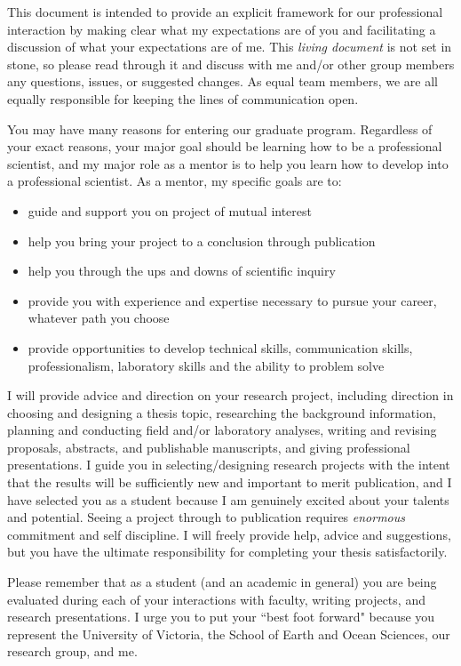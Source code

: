 \documentclass[11pt]{article}
\newcommand{\p}[1]{\vspace{1em} \noindent{\textbf{\textsc{#1~~}}}}
\begin{document}
\p{Summary} This document is intended to provide an explicit framework for our professional interaction by making clear what my expectations are of you and facilitating a discussion of what your expectations are of me. This \emph{living document} is not set in stone, so please read through it and discuss with me and/or other group members any questions, issues, or suggested changes. As equal team members, we are all equally responsible for keeping the lines of communication open.


\p{Goals} You may have many reasons for entering our graduate program. Regardless of your exact reasons, your major goal should be learning how to be a professional scientist, and my major role as a mentor is to help you learn how to develop into a professional scientist. As a mentor, my specific goals are to:
\begin{itemize}
\itemsep0em 
\item guide and support you on project of mutual interest
\item help you bring your project to a conclusion through publication
\item help you through the ups and downs of scientific inquiry
\item provide you with experience and expertise necessary to pursue your career, whatever path you choose
\item provide opportunities to develop technical skills, communication skills, professionalism, laboratory skills and the ability to problem solve
\end{itemize}
I will provide advice and direction on your research project, including direction in choosing and designing a thesis topic, researching the background information, planning and conducting field and/or laboratory analyses, writing and revising proposals, abstracts, and publishable manuscripts, and giving professional presentations.
I guide you in selecting/designing research projects with the intent that the results will be sufficiently new and important to merit publication, and I have selected you as a student because I am genuinely excited about your talents and potential.
Seeing a project through to publication requires \emph{enormous} commitment and self discipline.
I will freely provide help, advice and suggestions, but you have the ultimate responsibility for completing your thesis satisfactorily.

Please remember that as a student (and an academic in general) you are being evaluated during each of your interactions with faculty, writing projects, and research presentations. 
I urge you to put your ``best foot forward" because you represent the University of Victoria, the School of Earth and Ocean Sciences, our research group, and me.
\end{document}
